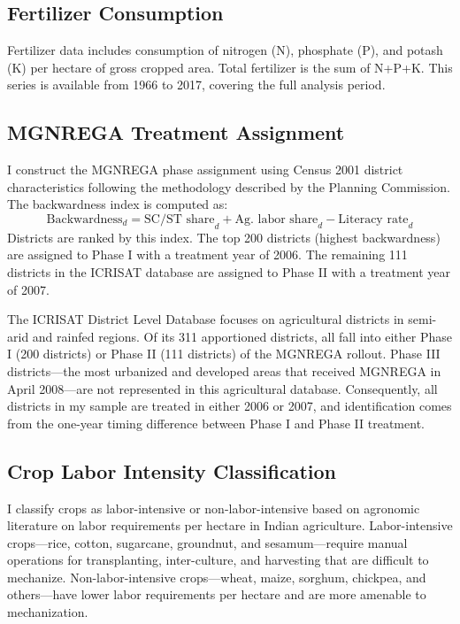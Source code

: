 \documentclass[12pt]{article}
\begin{document}
\subsection{Fertilizer Consumption}

Fertilizer data includes consumption of nitrogen (N), phosphate (P), and potash (K) per hectare of gross cropped area. Total fertilizer is the sum of N+P+K. This series is available from 1966 to 2017, covering the full analysis period.

\subsection{MGNREGA Treatment Assignment}

I construct the MGNREGA phase assignment using Census 2001 district characteristics following the methodology described by the Planning Commission. The backwardness index is computed as:
\begin{equation}
    \text{Backwardness}_d = \text{SC/ST share}_d + \text{Ag. labor share}_d - \text{Literacy rate}_d
\end{equation}
Districts are ranked by this index. The top 200 districts (highest backwardness) are assigned to Phase I with a treatment year of 2006. The remaining 111 districts in the ICRISAT database are assigned to Phase II with a treatment year of 2007.

The ICRISAT District Level Database focuses on agricultural districts in semi-arid and rainfed regions. Of its 311 apportioned districts, all fall into either Phase I (200 districts) or Phase II (111 districts) of the MGNREGA rollout. Phase III districts---the most urbanized and developed areas that received MGNREGA in April 2008---are not represented in this agricultural database. Consequently, all districts in my sample are treated in either 2006 or 2007, and identification comes from the one-year timing difference between Phase I and Phase II treatment.

\subsection{Crop Labor Intensity Classification}

I classify crops as labor-intensive or non-labor-intensive based on agronomic literature on labor requirements per hectare in Indian agriculture. Labor-intensive crops---rice, cotton, sugarcane, groundnut, and sesamum---require manual operations for transplanting, inter-culture, and harvesting that are difficult to mechanize. Non-labor-intensive crops---wheat, maize, sorghum, chickpea, and others---have lower labor requirements per hectare and are more amenable to mechanization.
\end{document}
